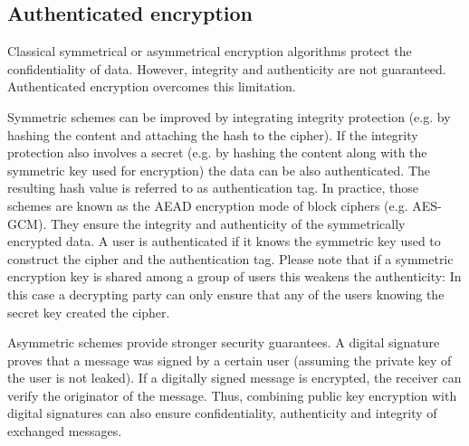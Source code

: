 \documentclass[../main.tex]{subfiles}
\begin{document}
\subsection{Authenticated encryption}
\label{sec:aead}
Classical symmetrical or asymmetrical encryption algorithms protect the confidentiality of data.
However, integrity and authenticity are not guaranteed.
Authenticated encryption overcomes this limitation.~\cite{Eckert2018, An2002}

Symmetric schemes can be improved by integrating integrity protection (e.g. by hashing the content and attaching the hash to the cipher).
If the integrity protection also involves a secret (e.g. by hashing the content along with the symmetric key used for encryption) the data can be also authenticated.
The resulting hash value is referred to as authentication tag.
In practice, those schemes are known as the AEAD encryption mode of block ciphers (e.g. AES-GCM).
They ensure the integrity and authenticity of the symmetrically encrypted data.
A user is authenticated if it knows the symmetric key used to construct the cipher and the authentication tag.
Please note that if a symmetric encryption key is shared among a group of users this weakens the authenticity:
In this case a decrypting party can only ensure that any of the users knowing the secret key created the cipher.~\cite[315]{Eckert2018}

Asymmetric schemes provide stronger security guarantees.
A digital signature proves that a message was signed by a certain user (assuming the private key of the user is not leaked).
If a digitally signed message is encrypted, the receiver can verify the originator of the message.
Thus, combining public key encryption with digital signatures can also ensure confidentiality, authenticity and integrity of exchanged messages.~\cite{An2002}
\end{document}
